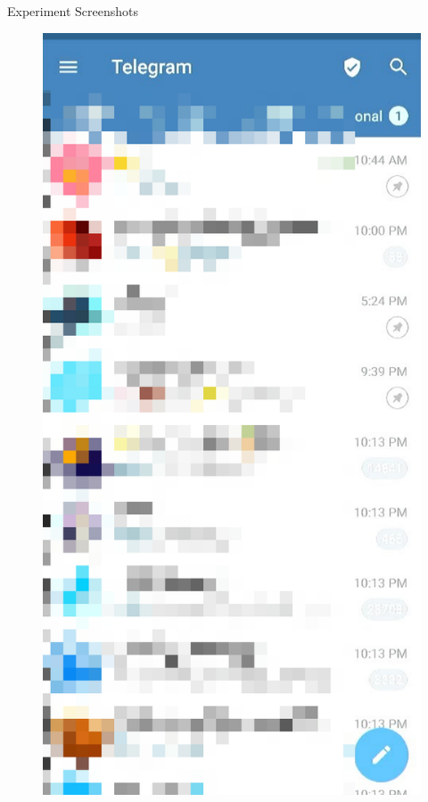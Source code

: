 \documentclass{beamer}
\begin{document}
\begin{frame}{Experiment Screenshots}
\begin{figure}[htbp]
\begin{minipage}[t]{0.3\textwidth}
		\end{minipage}
		\begin{minipage}[t]{0.3\textwidth}
			\centering
			\includegraphics[width=\textwidth]{Figs/twitter.png}
		\end{minipage}
	\end{figure}
\end{frame}
\end{document}
